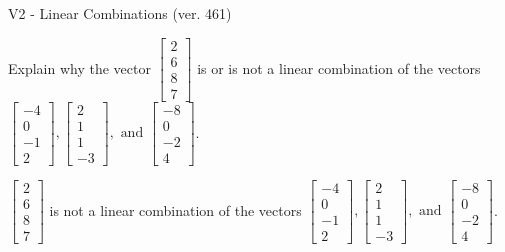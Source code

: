 \begin{exercise}
  \begin{exerciseTitle}V2 - Linear Combinations (ver. 461)\end{exerciseTitle}
  \begin{exerciseStatement}
    Explain why the vector \(\left[\begin{array}{c}
2 \\
6 \\
8 \\
7
\end{array}\right]\)  is or is not a linear 
	combination of the vectors \(\left[\begin{array}{c}
-4 \\
0 \\
-1 \\
2
\end{array}\right] , \left[\begin{array}{c}
2 \\
1 \\
1 \\
-3
\end{array}\right] , \text{ and } \left[\begin{array}{c}
-8 \\
0 \\
-2 \\
4
\end{array}\right]\).
	


  \end{exerciseStatement}
  \begin{exerciseAnswer}
   \(\left[\begin{array}{c}
2 \\
6 \\
8 \\
7
\end{array}\right]\) 
  	 is not  
	a linear combination of the vectors \(\left[\begin{array}{c}
-4 \\
0 \\
-1 \\
2
\end{array}\right] , \left[\begin{array}{c}
2 \\
1 \\
1 \\
-3
\end{array}\right] , \text{ and } \left[\begin{array}{c}
-8 \\
0 \\
-2 \\
4
\end{array}\right]\).

	
  


  \end{exerciseAnswer}
\end{exercise}